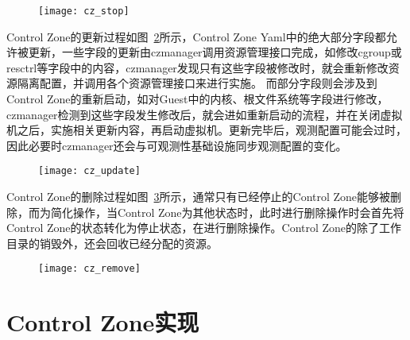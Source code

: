 \begin{figure}[!htbp]
    \centering
    \texttt{[image: cz\_stop]}
    \label{fig:cz_stop}
\end{figure}

Control Zone的更新过程如图~\ref{fig:cz_update}所示，Control Zone Yaml中的绝大部分字段都允许被更新，一些字段的更新由czmanager调用资源管理接口完成，如修改cgroup或resctrl等字段中的内容，czmanager发现只有这些字段被修改时，就会重新修改资源隔离配置，并调用各个资源管理接口来进行实施。 而部分字段则会涉及到Control Zone的重新启动，如对Guest中的内核、根文件系统等字段进行修改，czmanager检测到这些字段发生修改后，就会进如重新启动的流程，并在关闭虚拟机之后，实施相关更新内容，再启动虚拟机。更新完毕后，观测配置可能会过时，因此必要时czmanager还会与可观测性基础设施同步观测配置的变化。

\begin{figure}[!htbp]
    \centering
    \texttt{[image: cz\_update]}
    \label{fig:cz_update}
\end{figure}

Control Zone的删除过程如图~\ref{fig:cz_remove}所示，通常只有已经停止的Control Zone能够被删除，而为简化操作，当Control Zone为其他状态时，此时进行删除操作时会首先将Control Zone的状态转化为停止状态，在进行删除操作。Control Zone的除了工作目录的销毁外，还会回收已经分配的资源。

\begin{figure}[!htbp]
    \centering
    \texttt{[image: cz\_remove]}
    \label{fig:cz_remove}
\end{figure}

\section{Control Zone实现}



